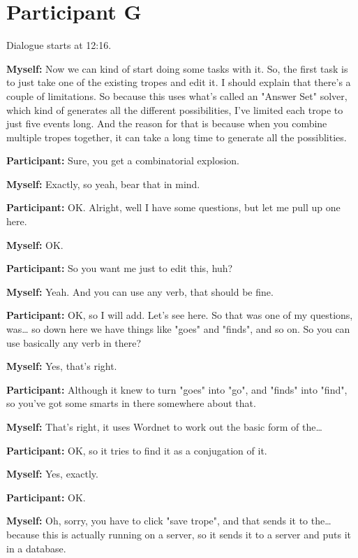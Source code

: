 \documentclass[11pt]{report}
\begin{document}
\section{Participant G}
Dialogue starts at 12:16.

\begin{linenumbers}
\textbf{Myself:} Now we can kind of start doing some tasks with it. So, the first task is to just take one of the existing tropes and edit it. I should explain that there's a couple of limitations. So because this uses what's called an "Answer Set" solver, which kind of generates all the different possibilities, I've limited each trope to just five events long. And the reason for that is because when you combine multiple tropes together, it can take a long time to generate all the possiblities.

\textbf{Participant:} Sure, you get a combinatorial explosion.

\textbf{Myself:} Exactly, so yeah, bear that in mind.

\textbf{Participant:} OK. Alright, well I have some questions, but let me pull up one here.

\textbf{Myself:} OK.

\textbf{Participant:} So you want me just to edit this, huh?

\textbf{Myself:} Yeah. And you can use any verb, that should be fine.

\textbf{Participant:} OK, so I will add. Let's see here. So that was one of my
questions, was\ldots{} so down here we have things like "goes" and "finds", and
so on. So you can use basically any verb in there?

\textbf{Myself:} Yes, that's right.

\textbf{Participant:} Although it knew to turn "goes" into "go", and "finds" into "find", so you've got some smarts in there somewhere about that.

\textbf{Myself:} That's right, it uses Wordnet to work out the basic form of the\ldots{}

\textbf{Participant:} OK, so it tries to find it as a conjugation of it.

\textbf{Myself:} Yes, exactly.

\textbf{Participant:} OK.

\textbf{Myself:} Oh, sorry, you have to click "save trope", and that sends it to the\ldots{} because this is actually running on a server, so it sends it to a server and puts it in a database.


\end{linenumbers}
\end{document}
